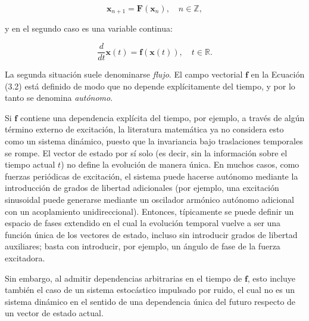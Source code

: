 \documentclass[10pt,a4paper]{book}
\begin{document}
\begin{equation}
\mathbf{x}_{n+1} = \mathbf{F}(\mathbf{x}_n), \quad n \in \mathbb{Z}, 
\end{equation}

y en el segundo caso es una variable continua:  

\begin{equation}
\frac{d}{dt}\mathbf{x}(t) = \mathbf{f}(\mathbf{x}(t)), \quad t \in \mathbb{R}.
\end{equation}

La segunda situación suele denominarse \textit{flujo}. El campo vectorial $\mathbf{f}$ en la Ecuación (3.2) está definido de modo que no depende explícitamente del tiempo, y por lo tanto se denomina \textit{autónomo}.

\bigskip

Si $\mathbf{f}$ contiene una dependencia explícita del tiempo, por ejemplo, a través de algún término externo de excitación, la literatura matemática ya no considera esto como un sistema dinámico, puesto que la invariancia bajo traslaciones temporales se rompe. El vector de estado por sí solo (es decir, sin la información sobre el tiempo actual $t$) no define la evolución de manera única. En muchos casos, como fuerzas periódicas de excitación, el sistema puede hacerse autónomo mediante la introducción de grados de libertad adicionales (por ejemplo, una excitación sinusoidal puede generarse mediante un oscilador armónico autónomo adicional con un acoplamiento unidireccional). Entonces, típicamente se puede definir un espacio de fases extendido en el cual la evolución temporal vuelve a ser una función única de los vectores de estado, incluso sin introducir grados de libertad auxiliares; basta con introducir, por ejemplo, un ángulo de fase de la fuerza excitadora. 

Sin embargo, al admitir dependencias arbitrarias en el tiempo de $\mathbf{f}$, esto incluye también el caso de un sistema estocástico impulsado por ruido, el cual no es un sistema dinámico en el sentido de una dependencia única del futuro respecto de un vector de estado actual.
\end{document}
